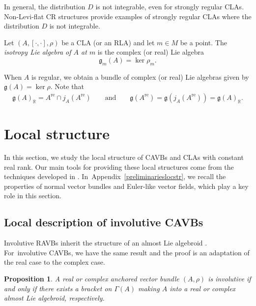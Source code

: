 \documentclass[11pt]{article}
\numberwithin{equation}{section}
\numberwithin{equation}{section}
\newtheorem{Proposition}[Theorem]{Proposition}
 { \theoremstyle{definition}
\newtheorem{Definition}[Theorem]{Definition}
\newtheorem{Note}[Theorem]{Note}
\newtheorem{Example}[Theorem]{Example}
\newtheorem{Examples}[Theorem]{Examples}
\newtheorem{Remark}[Theorem]{Remark} }
\newcommand{\R}{{\mathbb{R}}}
\newcommand{\g}{\mathfrak{g}}
\DeclareMathOperator{\real}{re}
\begin{document}
In general, the distribution $D$ is not integrable, even for strongly regular CLAs. Non-Levi-flat CR structures provide examples of strongly regular CLAs where the distribution $D$ is not integrable.
\begin{Definition}
Let $(A, [\cdot,\cdot], \rho)$ be a CLA (or an RLA) and let $m\in M$ be a point. The {\em isotropy Lie algebra of $A$ at $m$} is the complex (or real) Lie algebra
\[\g_m (A)=\ker\rho_m.\]
\end{Definition}
When $A$ is regular, we obtain a bundle of complex (or real) Lie algebras given by $\g(A)=\ker \rho$.
 Note that
 \begin{align*}
  \g(A)_{\R}= A^{\real}\cap j_A(A^{\real}) \qquad \text{and}\qquad
\g(A^{\real})=\g(j_A(A^{\real}))=\g(A)_{\R}.
   \end{align*}


\section{Local structure}\label{locstr}
In this section, we study the local structure of CAVBs and CLAs with constant real rank. Our main tools for providing these local structures come from the techniques developed in \cite{bursztyn2019splitting}. In~Appendix~\ref{preliminarieslocstr}, we recall the properties of normal vector bundles and Euler-like vector fields, which play a key role in this section.
\subsection{Local description of involutive CAVBs}%
Involutive RAVBs inherit the structure of an almost Lie algebroid \cite[Proposition 3.17]{bursztyn2019splitting}. For~involutive CAVBs, we have the same result and the proof is an adaptation of the real case to the complex case.
\begin{Proposition}
A real or complex anchored vector bundle $(A,\rho)$ is involutive if and only if there exists a bracket on $\Gamma(A)$ making $A$ into a real or complex almost Lie algebroid, respectively.
\end{Proposition}
\end{document}
